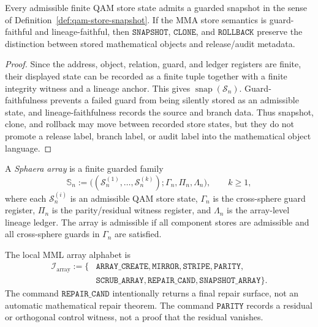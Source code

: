 \begin{proposition}\label{prop:qam-store-snapshot-stability}
Every admissible finite QAM store state admits a guarded snapshot in the sense of Definition~\ref{def:qam-store-snapshot}. If the MMA store semantics is guard-faithful and lineage-faithful, then \(\texttt{SNAPSHOT}\), \(\texttt{CLONE}\), and \(\texttt{ROLLBACK}\) preserve the distinction between stored mathematical objects and release/audit metadata.
\end{proposition}

\begin{proof}
Since the address, object, relation, guard, and ledger registers are finite, their displayed state can be recorded as a finite tuple together with a finite integrity witness and a lineage anchor. This gives \(\operatorname{snap}(\mathcal S_n)\). Guard-faithfulness prevents a failed guard from being silently stored as an admissible state, and lineage-faithfulness records the source and branch data. Thus snapshot, clone, and rollback may move between recorded store states, but they do not promote a release label, branch label, or audit label into the mathematical object language.
\end{proof}

\begin{definition}\label{def:sphaera-array}
A \emph{Sphaera array} is a finite guarded family
\[
 \mathbb S_n
 :=
 \bigl((\mathcal S_n^{(1)},\ldots,\mathcal S_n^{(k)});\Gamma_n,\Pi_n,\Lambda_n\bigr),
 \qquad k\ge 1,
\]
where each \(\mathcal S_n^{(i)}\) is an admissible QAM store state, \(\Gamma_n\) is the cross-sphere guard register, \(\Pi_n\) is the parity/residual witness register, and \(\Lambda_n\) is the array-level lineage ledger. The array is admissible if all component stores are admissible and all cross-sphere guards in \(\Gamma_n\) are satisfied.
\end{definition}

\begin{definition}\label{def:sphaera-array-instructions}
The local MML array alphabet is
\[
\begin{aligned}
 \mathcal I_{\mathrm{array}}
 :=\{&\texttt{ARRAY\_CREATE},\texttt{MIRROR},\texttt{STRIPE},\texttt{PARITY},\\
 &\texttt{SCRUB\_ARRAY},\texttt{REPAIR\_CAND},\texttt{SNAPSHOT\_ARRAY}\}.
\end{aligned}
\]
The command \(\texttt{REPAIR\_CAND}\) intentionally returns a final repair surface, not an automatic mathematical repair theorem. The command \(\texttt{PARITY}\) records a residual or orthogonal control witness, not a proof that the residual vanishes.
\end{definition}

